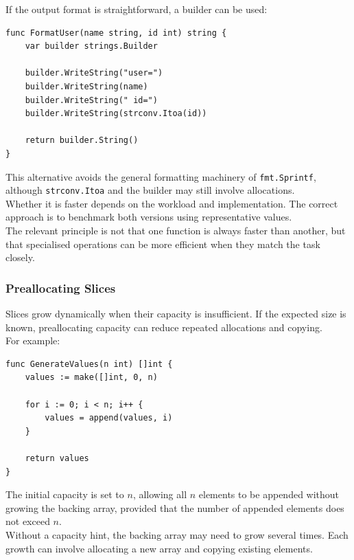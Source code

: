If the output format is straightforward, a builder can be used:

\begin{lstlisting}
func FormatUser(name string, id int) string {
    var builder strings.Builder

    builder.WriteString("user=")
    builder.WriteString(name)
    builder.WriteString(" id=")
    builder.WriteString(strconv.Itoa(id))

    return builder.String()
}
\end{lstlisting}

This alternative avoids the general formatting machinery of \texttt{fmt.Sprintf}, although \texttt{strconv.Itoa} and the builder may still involve allocations.\\

Whether it is faster depends on the workload and implementation. The correct approach is to benchmark both versions using representative values.\\

The relevant principle is not that one function is always faster than another, but that specialised operations can be more efficient when they match the task closely.\\

\subsubsection{Preallocating Slices}

Slices grow dynamically when their capacity is insufficient. If the expected size is known, preallocating capacity can reduce repeated allocations and copying.\\

For example:

\begin{lstlisting}
func GenerateValues(n int) []int {
    values := make([]int, 0, n)

    for i := 0; i < n; i++ {
        values = append(values, i)
    }

    return values
}
\end{lstlisting}

The initial capacity is set to \(n\), allowing all \(n\) elements to be appended without growing the backing array, provided that the number of appended elements does not exceed \(n\).\\

Without a capacity hint, the backing array may need to grow several times. Each growth can involve allocating a new array and copying existing elements.\\

